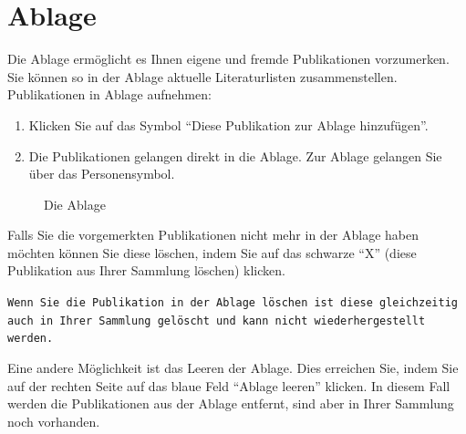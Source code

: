 \section{Ablage}
\label{sec:ablage}
Die Ablage ermöglicht es Ihnen eigene und fremde Publikationen vorzumerken. Sie können so in der Ablage aktuelle Literaturlisten zusammenstellen.
\newline
Publikationen in Ablage aufnehmen: %
\begin{enumerate}
    \item Klicken Sie auf das Symbol \enquote{Diese Publikation zur Ablage hinzufügen}.
    \item Die Publikationen gelangen direkt in die Ablage. Zur Ablage gelangen Sie über das Personensymbol.
\end{enumerate}
\begin{figure}[h!]
 \centering
 \caption{Die Ablage}
 \label{fig:ablage}
\end{figure} 
Falls Sie die vorgemerkten Publikationen nicht mehr in der Ablage haben möchten können Sie diese löschen, indem Sie auf das schwarze \enquote{X} (diese Publikation aus Ihrer Sammlung löschen) klicken.\newline
\begin{mdframed}[style=mdfexample1,frametitle={\texttt{ACHTUNG}},backgroundcolor=gray!40]\texttt{Wenn Sie die Publikation in der Ablage löschen ist diese gleichzeitig auch in Ihrer Sammlung gelöscht und kann nicht wiederhergestellt werden.}
\end{mdframed}

Eine andere Möglichkeit ist das Leeren der Ablage. Dies erreichen Sie, indem Sie auf der rechten Seite auf das blaue Feld \enquote{Ablage leeren} klicken. In diesem Fall werden die Publikationen aus der Ablage entfernt, sind aber in Ihrer Sammlung noch vorhanden.
